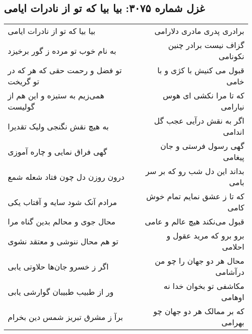 \begin{center}
\section*{غزل شماره ۳۰۷۵: بیا بیا که تو از نادرات ایامی}
\label{sec:3075}
\begin{longtable}{l p{0.5cm} r}
بیا بیا که تو از نادرات ایامی
&&
برادری پدری مادری دلارامی
\\
به نام خوب تو مرده ز گور برخیزد
&&
گزاف نیست برادر چنین نکونامی
\\
تو فضل و رحمت حقی که هر که در تو گریخت
&&
قبول می کنیش با کژی و با خامی
\\
همی‌زیم به ستیزه و این هم از گولیست
&&
که تا مرا نکشی ای هوس نیارامی
\\
به هیچ نقش نگنجی ولیک تقدیرا
&&
اگر به نقش درآیی عجب گل اندامی
\\
گهی فراق نمایی و چاره آموزی
&&
گهی رسول فرستی و جان پیغامی
\\
درون روزن دل چون فتاد شعله شمع
&&
بداند این دل شب رو که بر سر بامی
\\
مرادم آنک شود سایه و آفتاب یکی
&&
که تا ز عشق نمایم تمام خوش کامی
\\
محال جوی و محالم بدین گناه مرا
&&
قبول می‌نکند هیچ عالم و عامی
\\
تو هم محال ننوشی و معتقد نشوی
&&
برو برو که مرید عقول و احلامی
\\
اگر ز خسرو جان‌ها حلاوتی یابی
&&
محال هر دو جهان را چو من درآشامی
\\
ور از طبیب طبیبان گوارشی یابی
&&
مکاشفی تو بخوان خدا نه اوهامی
\\
برآ ز مشرق تبریز شمس دین بخرام
&&
که بر ممالک هر دو جهان چو بهرامی
\\
\end{longtable}
\end{center}
